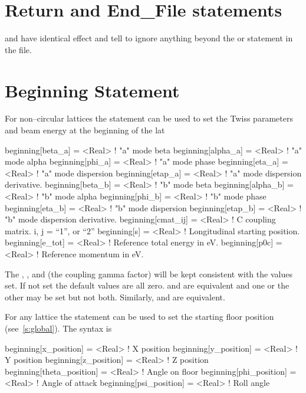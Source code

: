 \section{Return and End_File statements}

 and  have identical effect and tell \bmad to
ignore anything beyond the  or  statement in
the file.

\section{Beginning Statement}
\label{s:beginning}

For non--circular lattices the  statement can be used to
set the Twiss parameters and beam energy at the beginning of the lat
\begin{example}
  beginning[beta_a]  = <Real>  ! "a" mode beta
  beginning[alpha_a] = <Real>  ! "a" mode alpha
  beginning[phi_a]   = <Real>  ! "a" mode phase
  beginning[eta_a]   = <Real>  ! "a" mode dispersion
  beginning[etap_a]  = <Real>  ! "a" mode dispersion derivative.
  beginning[beta_b]  = <Real>  ! "b" mode beta
  beginning[alpha_b] = <Real>  ! "b" mode alpha
  beginning[phi_b]   = <Real>  ! "b" mode phase
  beginning[eta_b]   = <Real>  ! "b" mode dispersion
  beginning[etap_b]  = <Real>  ! "b" mode dispersion derivative.
  beginning[cmat_ij] = <Real>  ! C coupling matrix. i, j = {``1'', or ``2''} 
  beginning[s]       = <Real>  ! Longitudinal starting position.
  beginning[e_tot]   = <Real>  ! Reference total energy in eV.
  beginning[p0c]     = <Real>  ! Reference momentum in eV.
\end{example}
The , , and  (the coupling gamma
factor) will be kept consistent with the values set. If not set the
default values are all zero.   and
 are equivalent and one or the other may be
set but not both. Similarly,  and
 are equivalent.

For any lattice the  statement can be used to set the starting floor position 
(see~\ref{s:global}). The syntax is
\begin{example}
  beginning[x_position]     = <Real>  ! X position
  beginning[y_position]     = <Real>  ! Y position
  beginning[z_position]     = <Real>  ! Z position
  beginning[theta_position] = <Real>  ! Angle on floor
  beginning[phi_position]   = <Real>  ! Angle of attack
  beginning[psi_position]   = <Real>  ! Roll angle
\end{example}

